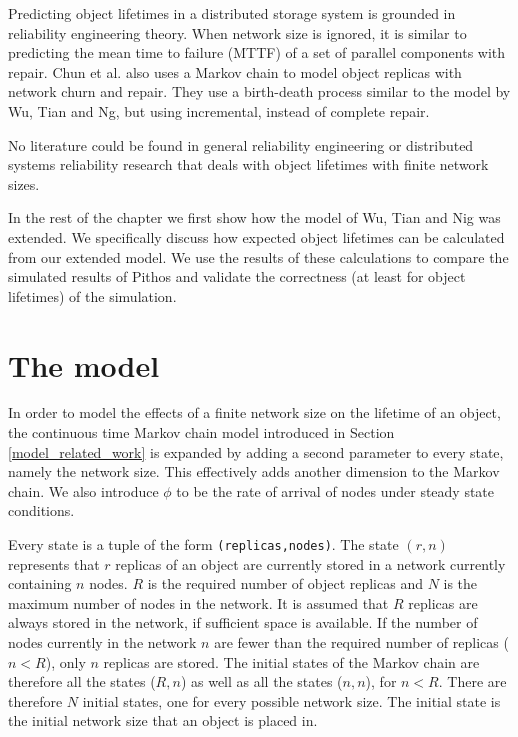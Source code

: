 \documentclass[10pt,a4paper,conference]{IEEEtran}
\begin{document}
Predicting object lifetimes in a distributed storage system is grounded in reliability engineering theory. When network size is ignored, it is similar to predicting the mean time to failure (MTTF) of a set of parallel components with repair. Chun et al. \cite{Chun:2006_replica_maintenance} also uses a Markov chain to model object replicas with network churn and repair. They use a birth-death process similar to the model by Wu, Tian and Ng, but using incremental, instead of complete repair.

No literature could be found in general reliability engineering or distributed systems reliability research that deals with object lifetimes with finite network sizes.

In the rest of the chapter we first show how the model of Wu, Tian and Nig was extended. We specifically discuss how expected object lifetimes can be calculated from our extended model. We use the results of these calculations to compare the simulated results of Pithos and validate the correctness (at least for object lifetimes) of the simulation.

\section{The model}
\label{model}

In order to model the effects of a finite network size on the lifetime of an object, the continuous time Markov chain model introduced in Section \ref{model_related_work} is expanded by adding a second parameter to every state, namely the network size. This effectively adds another dimension to the Markov chain. We also introduce $\phi$ to be the rate of arrival of nodes under steady state conditions.

Every state is a tuple of the form \verb.(replicas,nodes).. The state $(r, n)$ represents that $r$ replicas of an object are currently stored in a network currently containing $n$ nodes. $R$ is the required number of object replicas and $N$ is the maximum number of nodes in the network. It is assumed that $R$ replicas are always stored in the network, if sufficient space is available. If the number of nodes currently in the network $n$ are fewer than the required number of replicas ($n < R$), only $n$ replicas are stored. The initial states of the Markov chain are therefore all the states ($R,n$) as well as all the states ($n,n$), for $n < R$. There are therefore $N$ initial states, one for every possible network size. The initial state is the initial network size that an object is placed in.
\end{document}
